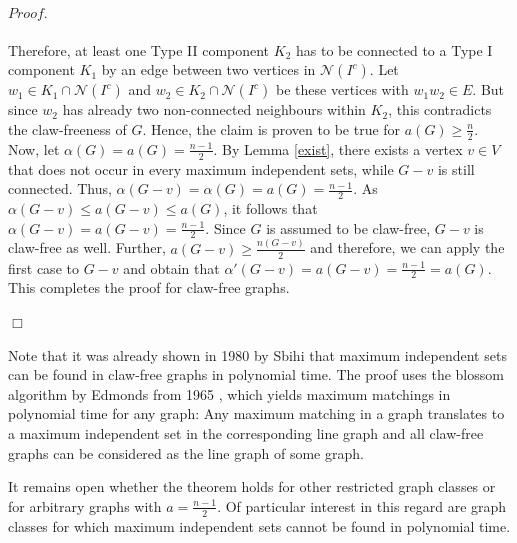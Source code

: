 \documentclass{scrartcl}
\newenvironment{proof}{\paragraph{$\mathit{Proof.}$}
	\vspace{-.4cm}\hspace{-.3cm}}{\vspace{-.2cm}\begin{flushright}$\Box$\end{flushright}}
\begin{document}
\begin{proof}
		Therefore, at least one Type II component $K_2$ has to be connected to a Type I component $K_1$ by an edge between two vertices in $\mathcal{N}(I^c)$.
		Let $w_1\in K_1\cap \mathcal{N}(I^c)$ and $w_2\in K_2\cap \mathcal{N}(I^c)$ be these vertices with $w_1w_2\in E$.
		But since $w_2$ has already two non-connected neighbours within $K_2$, this contradicts the claw-freeness of $G$. Hence, the claim is proven to be true for $a(G)\geq\frac n2$.\\
		Now, let $\alpha(G)=a(G)=\frac{n-1}{2}$. 
		By Lemma \ref{exist}, there exists a vertex $v\in V$ that does not occur in every maximum independent sets, while $G-v$ is still connected. 
		Thus, $\alpha(G-v)=\alpha(G)=a(G)=\frac{n-1}{2}$.
		As $\alpha(G-v)\leq a(G-v)\leq a(G)$, it follows that $\alpha(G-v)=a(G-v)=\frac{n-1}{2}$.
		Since $G$ is assumed to be claw-free, $G-v$ is claw-free as well. 
		Further, $a(G-v)\geq \frac{n(G-v)}{2}$ and therefore, we can apply the first case to $G-v$ and obtain that $\alpha'(G-v)=a(G-v)=\frac{n-1}{2}=a(G)$.
		This completes the proof for claw-free graphs.\vspace{-.43cm}
	\end{proof}
	
	\noindent
	Note that it was already shown in 1980 by Sbihi \cite{Sbihi1980} that maximum independent sets can be found in claw-free graphs in polynomial time. 
	The proof uses the blossom algorithm by Edmonds from 1965 \cite{Edmonds1965}, which yields maximum matchings in polynomial time for any graph: 
	Any maximum matching in a graph translates to a maximum independent set in the corresponding line graph and all claw-free graphs can be considered as the line graph of some graph.
	
	It remains open whether the theorem holds for other restricted graph classes or for arbitrary graphs with $a=\frac{n-1}{2}$. Of particular interest in this regard are graph classes for which maximum independent sets cannot be found in polynomial time.
	

	
	 
	
\end{document}
